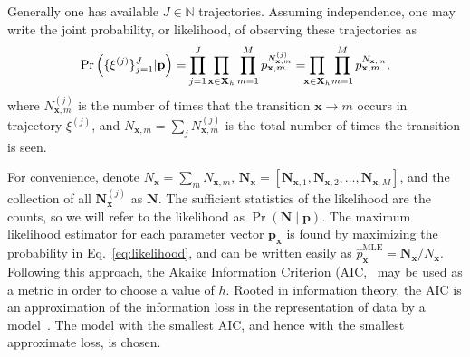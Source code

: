 \documentclass[prl,twocolumn,groupedaddress]{revtex4-1}
\newcommand{\bN}{\mathbf{N}}
\newcommand{\bx}{\mathbf{x}}
\newcommand{\bp}{\mathbf{p}}
\begin{document}
Generally one has available  $J\in\mathbb{N}$ trajectories. Assuming independence, one may write the joint probability, or likelihood, of observing these trajectories as
\begin{align}
\Pr\left(\{\xi^{(j)} \}_{j=1}^J \vert \bp\right) = \smashoperator{\prod_{j=1}^J} \prod_{\bx\in\mathbf{X}_h} \prod_{m=1}^M p_{\bx,m}^{N^{(j)}_{\bx,m}} = \smashoperator{\prod_{\bx\in\mathbf{X}_h} }\ \prod_{m=1}^M p_{\bx,m}^{N_{\bx,m}} ,
\label{eq:likelihood}
\end{align}
where $N^{(j)}_{\bx,m}$ is the number of times that the transition $\bx\to m$ occurs in trajectory $\xi^{(j)}$, and $N_{\bx,m} = \sum_j N^{(j)}_{\bx,m}$ is the total number of times the transition is seen.%

For convenience,  denote $N_{\bx} =\sum_{m}N_{\bx,m}$,  $\bN_{\bx}= [\bN_{\bx,1},\bN_{\bx,2},\ldots,\bN_{\bx,M}]$, and the collection of all $\bN^{(j)}_{\bx}$ as $\bN$. The sufficient statistics of the likelihood are the counts, so we will refer to the likelihood as $\Pr(\bN\mid\bp)$. The maximum likelihood estimator for each parameter vector $\bp_\bx$ is found by maximizing the probability in Eq.~\ref{eq:likelihood}, and can be written easily as
$\hat{p}^{\textrm{MLE}}_{\bx} = \mathbf{N}_{\bx} / N_{\bx}$. 
Following this approach, the Akaike Information Criterion (AIC,~\cite{akaike1974new,tong1975determination,katz1981some}  %
 may be used as a metric in order to choose a value of $h$.  Rooted in information theory, the AIC is an approximation of the information loss in the representation of data by a model~\cite{burnham2003model}. The model with the smallest AIC, and hence with the smallest approximate loss, is chosen.
\end{document}
